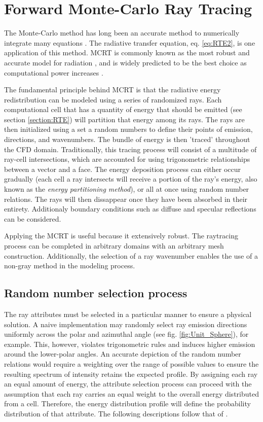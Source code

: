 \section{Forward Monte-Carlo Ray Tracing}
The Monte-Carlo method has long been an accurate method to numerically integrate many equations \cite{Howell2021TheTransfer}. 
The radiative transfer equation, eq. \ref{eq:RTE2}, is one application of this method. 
MCRT is commonly known as the most robust and accurate model for radiation \cite{Tesse2002RadiativeApproach}, and is widely predicted to be the best choice as computational power increases \cite{Liu2020TheFlames,Howell2021TheTransfer}.

The fundamental principle behind MCRT is that the radiative energy redistribution can be modeled using a series of randomized rays. 
Each computational cell that has a quantity of energy that should be emitted (see section \ref{section:RTE}) will partition that energy among its rays. The rays are then initialized using a set a random numbers to define their points of emission, directions, and wavenumbers.
The bundle of energy is then 'traced' throughout the CFD domain. Traditionally, this tracing process will consist of a multitude of ray-cell intersections, which are accounted for using trigonometric relationships between a vector and a face.
The energy deposition process can either occur gradually (each cell a ray intersects will receive a portion of the ray's energy, also known as the \textit{energy partitioning method}), or all at once using random number relations.
The rays will then dissappear once they have been absorbed in their entirety. Additionaly boundary conditions such as diffuse and specular reflections can be considered.

Applying the MCRT is useful because it extensively robust. The raytracing process can be completed in arbitrary domains with an arbitrary mesh construction. Additionally, the selection of a ray wavenumber enables the use of a non-gray method in the modeling process.

\subsection{Random number selection process}  \label{section:randomnumberrelations}
The ray attributes must be selected in a particular manner to ensure a physical solution. A naive implementation may randomly select ray emission directions uniformly across the polar and azimuthal angle (see fig. \ref{fig:Unit_Sphere}), for example. This, however, violates trigonometric rules and induces higher emission around the lower-polar angles. 
An accurate depiction of the random number relations would require a weighting over the range of possible values to ensure the resulting spectrum of intensity retains the expected profile. 
By assigning each ray an equal amount of energy, the attribute selection process can proceed with the assumption that each ray carries an equal weight to the overall energy distributed from a cell.
Therefore, the energy distribution profile will define the probability distribution of that attribute.
The following descriptions follow that of \citet{Modest2013RadiativeTransfer}.

